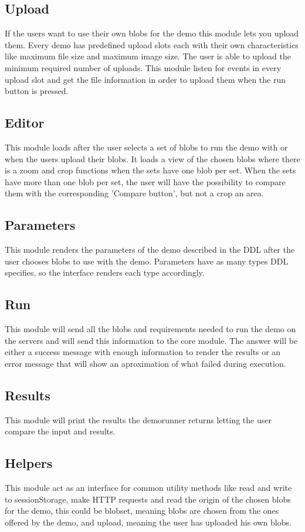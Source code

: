 \subsection{Upload}
If the users want to use their own blobs for the demo this module lets you upload them. Every demo has predefined 
upload slots each with their own characteristics like maximum file size and maximum image size. The user is able to upload the 
minimum required number of uploads. This module listen for events in every upload slot and get the file information in order to 
upload them when the run button is pressed.


\subsection{Editor}
This module loads after the user selects a set of blobs to run the demo with or when the users upload their blobs. It loads a view of
the chosen blobs where there is a zoom and crop functions when the sets have one blob per set. When the sets have more than 
one blob per set, the user will have the possibility to compare them with the corresponding 'Compare button', but not a crop 
an area.

\subsection{Parameters}
This module renders the parameters of the demo described in the DDL after the user chooses blobs to use with the demo. 
Parameters have as many types DDL specifies, so the interface renders each type accordingly.

\subsection{Run}
This module will send all the blobs and requirements needed to run the demo on the servers and will send this information to 
the core module. The answer will be either a success message with enough information to render the results or an error message 
that will show an aproximation of what failed during execution.

\subsection{Results}
This module will print the results the demorunner returns letting the user compare the input and results.

\subsection{Helpers}
This module act as an interface for common utility methods like read and write to sessionStorage, make HTTP requests and 
read the origin of the chosen blobs for the demo, this could be blobset, meaning blobs are chosen from the ones offered by the 
demo, and upload, meaning the user has uploaded his own blobs.

